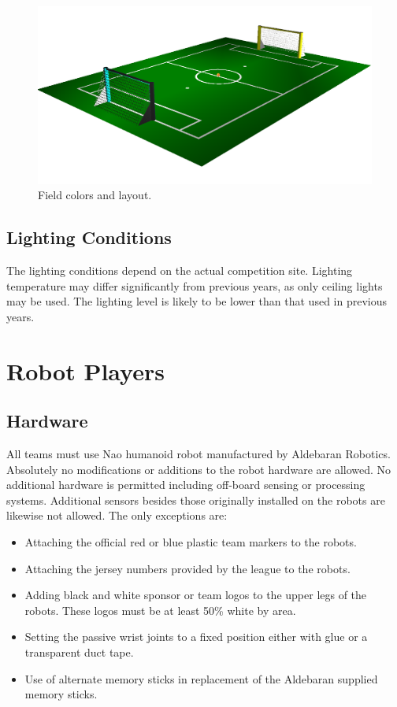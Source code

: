 \documentclass[12pt]{article}
\begin{document}
\begin{figure}[t]
\centerline{\includegraphics[width=\columnwidth]{figs/Nao2009Field-View.png}}
\caption{Field colors and layout.}
\label{fig:field_color}
\end{figure}


\subsection{Lighting Conditions}
The lighting conditions depend on the actual competition site.
Lighting temperature may differ significantly from previous years, as
only ceiling lights may be used. The lighting level is likely to be lower than that used in previous years.

\section{Robot Players}

\subsection{Hardware}

All teams must use Nao humanoid robot manufactured by Aldebaran Robotics. Absolutely no
modifications or additions to the robot hardware are allowed. No
additional hardware is permitted including off-board sensing or
processing systems. Additional sensors besides those originally
installed on the robots are likewise not allowed. The only
exceptions are:

\begin{itemize}
\item Attaching the official red or blue plastic team markers to the robots.
\item Attaching the jersey numbers provided by the league to the robots.
\item Adding black and white sponsor or team logos to the upper legs of the
robots. These logos must be at least 50\% white by area.
\item Setting the passive wrist joints to a fixed position either with glue or a transparent duct tape.
\item Use of alternate memory sticks in replacement of the Aldebaran supplied memory sticks.
\end{itemize}
\end{document}
